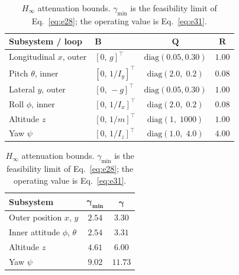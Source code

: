 \documentclass[10pt,letterpaper]{article}
\begin{document}
\begin{table}[tbp]
    \centering
    \begin{minipage}[t]{0.575\textwidth}\centering\footnotesize
        \caption{Design weights per subsystem, Eqs.~\eqref{eq:e25}--\eqref{eq:e26}.}
        \label{tab:weights}
        \begin{tabular}{llcc}
            \toprule
            \textbf{Subsystem / loop} & $\boldsymbol{B}$       & $\boldsymbol{Q}$           & $\boldsymbol{R}$ \\
            \midrule
            Longitudinal $x$, outer   & $[0,\,g]^{\!\top}$     & $\mathrm{diag}(0.05,0.30)$ & $1.00$           \\
            Pitch $\theta$, inner     & $[0,\,1/I_y]^{\!\top}$ & $\mathrm{diag}(2.0,\;0.2)$ & $0.08$           \\
            Lateral $y$, outer        & $[0,\,-g]^{\!\top}$    & $\mathrm{diag}(0.05,0.30)$ & $1.00$           \\
            Roll $\phi$, inner        & $[0,\,1/I_x]^{\!\top}$ & $\mathrm{diag}(2.0,\;0.2)$ & $0.08$           \\
            Altitude $z$              & $[0,\,1/m]^{\!\top}$   & $\mathrm{diag}(1,\;1000)$  & $1.00$           \\
            Yaw $\psi$                & $[0,\,1/I_z]^{\!\top}$ & $\mathrm{diag}(1.0,\;4.0)$ & $4.00$           \\
            \bottomrule
        \end{tabular}
    \end{minipage}\hfill
    \begin{minipage}[t]{0.405\textwidth}\centering\footnotesize
        \caption{$H_\infty$ attenuation bounds. $\gamma_{\min}$ is the feasibility limit of
            Eq.~\eqref{eq:e28}; the operating value is Eq.~\eqref{eq:e31}.}
        \label{tab:gamma}
        \begin{tabular}{lcc}
            \toprule
            \textbf{Subsystem}              & $\boldsymbol{\gamma_{\min}}$ & $\boldsymbol{\gamma}$ \\
            \midrule
            Outer position $x$, $y$         & $2.54$                       & $3.30$                \\
            Inner attitude $\phi$, $\theta$ & $2.54$                       & $3.31$                \\
            Altitude $z$                    & $4.61$                       & $6.00$                \\
            Yaw $\psi$                      & $9.02$                       & $11.73$               \\
            \bottomrule
        \end{tabular}
    \end{minipage}
\end{table}
\end{document}
